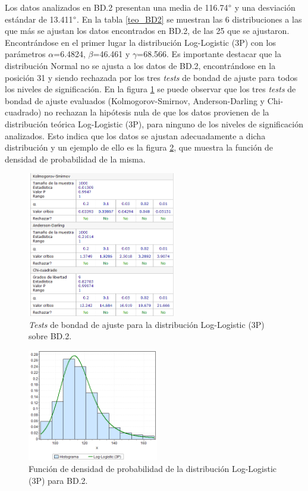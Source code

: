 \documentclass[12pt]{report}
\begin{document}
Los datos analizados en BD.2 presentan una media de 116.74$\degree$ y una desviación estándar de 13.411$\degree$.
En la tabla \ref{teo_BD2}  se muestran las 6 distribuciones a las que más se ajustan los datos encontrados en BD.2, de las 25 que se ajustaron. Encontrándose en el primer lugar la distribución Log-Logistic (3P) con los parámetros $\alpha$=6.4824, $\beta$=46.461 y $\gamma$=68.566. Es importante destacar que la distribución Normal no se ajusta a los datos de BD.2, encontrándose en la posición 31 y siendo rechazada por los tres \textit{tests} de bondad de ajuste para todos los niveles de significación. En la figura \ref{4TD_BONDAD} se puede observar que los tres \textit{tests} de bondad de ajuste evaluados (Kolmogorov-Smirnov, Anderson-Darling y Chi-cuadrado) no rechazan la hipótesis nula de que los datos provienen de la distribución teórica Log-Logistic (3P), para ninguno de los niveles de significación analizados. Esto indica que los datos se ajustan adecuadamente a dicha distribución y un ejemplo de ello es la figura \ref{4TD_FDP}, que muestra la función de densidad de probabilidad de la misma. 
\begin{figure}[hbpt]
	\centering
	
	\includegraphics[width=0.58\textwidth]{4td_bondad.png}
	\caption{\textit{Tests} de bondad de ajuste para la distribución Log-Logistic (3P) sobre BD.2.}
	\label{4TD_BONDAD}
\end{figure}


\begin{figure}[htbp]
	\centering
	
	\includegraphics[width=0.51\textwidth]{4td_fdp.png}
	\caption{Función de densidad de probabilidad de la  distribución Log-Logistic (3P) para BD.2.}
	\label{4TD_FDP}
\end{figure}
\end{document}
